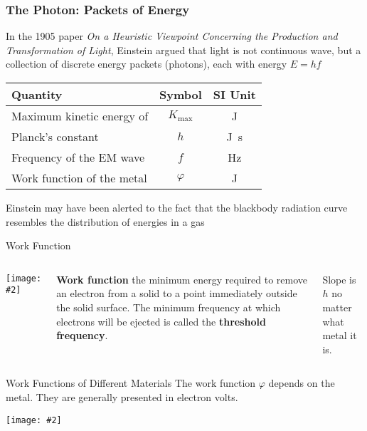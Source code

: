 \documentclass[12pt,compress,aspectratio=169]{beamer}
\newcommand{\pic}[2]{\texttt{[image: \#2]}}
\newcommand{\eq}[2]{\vspace{#1}{\Large\begin{displaymath}#2\end{displaymath}}}
\begin{document}
\begin{frame}
  \frametitle{The Photon: Packets of Energy}
  In the 1905 paper \emph{On a Heuristic Viewpoint Concerning the Production and
    Transformation of Light}, Einstein argued that light is not continuous
  wave, but a collection of discrete energy packets (photons), each with energy
  $E=hf$

  \eq{-.22in}{
    \boxed{K_\mathrm{max}=
      \begin{cases}
        hf-\varphi & \text{if }hf>\varphi\\
        0          & \text{otherwise}
      \end{cases}
    }
  }
  \begin{center}
    \begin{tabular}{l|c|c}
      \rowcolor{pink}
      \textbf{Quantity} & \textbf{Symbol} & \textbf{SI Unit} \\ \hline
      Maximum kinetic energy of   & $K_\mathrm{max}$ & \si{\joule}\\
      Planck's constant           & $h$   & \si{\joule.\second}\\
      Frequency of the EM wave    & $f$   & \si{\hertz}\\
      Work function of the metal  & $\varphi$ & \si{\joule}
    \end{tabular}
  \end{center}
  Einstein may have been alerted to the fact that the blackbody radiation curve
  resembles the distribution of energies in a gas
\end{frame}



\begin{frame}{Work Function}
  \begin{columns}
  \pic{1}{550px-Photoelectric_effect_diagram.png}
  
  \textbf{Work function} the minimum energy required to remove an electron
  from a solid to a point immediately outside the solid surface. The minimum
  frequency at which electrons will be ejected is called the
  \textbf{threshold frequency}.

  \vspace{.15in}Slope is $h$ no matter what metal it is.
  \end{columns}
\end{frame}



\begin{frame}{Work Functions of Different Materials}
  The work function $\varphi$ depends on the metal. They are generally presented
  in electron volts.
  \begin{center}
    \pic{.35}{work-function.png}
  \end{center}
\end{frame}
\end{document}
